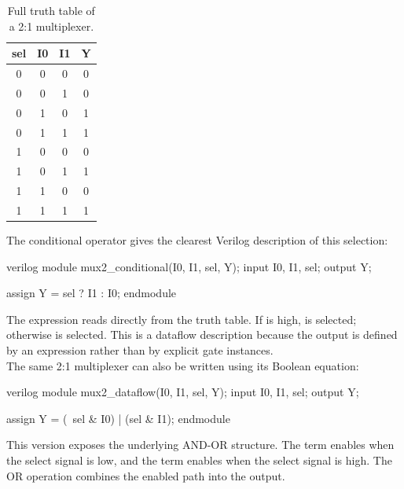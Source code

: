 \begin{table}[H]
\centering
\renewcommand{\arraystretch}{1.2}
\begin{tabular}{|c|c|c|c|}
\hline
\textbf{sel} & \textbf{I0} & \textbf{I1} & \textbf{Y} \\
\hline
0 & 0 & 0 & 0 \\
\hline
0 & 0 & 1 & 0 \\
\hline
0 & 1 & 0 & 1 \\
\hline
0 & 1 & 1 & 1 \\
\hline
1 & 0 & 0 & 0 \\
\hline
1 & 0 & 1 & 1 \\
\hline
1 & 1 & 0 & 0 \\
\hline
1 & 1 & 1 & 1 \\
\hline
\end{tabular}
\caption{Full truth table of a 2:1 multiplexer.}
\label{tab:mux2_truth}
\end{table}

\noindent The conditional operator gives the clearest Verilog description of this selection:

\begin{codeblock}{verilog}
module mux2_conditional(I0, I1, sel, Y);
    input I0, I1, sel;
    output Y;

    assign Y = sel ? I1 : I0;
endmodule
\end{codeblock}

\noindent The expression reads directly from the truth table. If  is high,
 is selected; otherwise  is selected. This is a dataflow description
because the output is defined by an expression rather than by explicit gate instances.\\

\noindent The same 2:1 multiplexer can also be written using its Boolean equation:

\begin{codeblock}{verilog}
module mux2_dataflow(I0, I1, sel, Y);
    input I0, I1, sel;
    output Y;

    assign Y = (~sel & I0) | (sel & I1);
endmodule
\end{codeblock}

\noindent This version exposes the underlying AND-OR structure. The term 
enables  when the select signal is low, and the term  enables
 when the select signal is high. The OR operation combines the enabled path into the
output.

